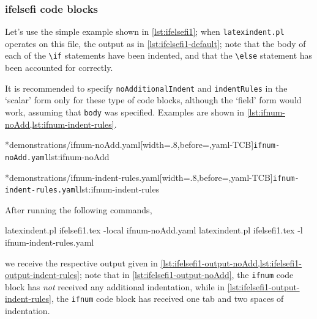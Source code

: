 \subsubsection{ifelsefi code blocks}
	Let's use the simple example shown in \cref{lst:ifelsefi1}; when
	\texttt{latexindent.pl} operates on this file, the output as in \cref{lst:ifelsefi1-default};
	note that the body of each of the \lstinline!\if! statements have been indented,
	and that the \lstinline!\else! statement has been accounted for correctly.

	\begin{minipage}{.45\textwidth}
	\end{minipage}%
	\hfill
	\begin{minipage}{.54\textwidth}
	\end{minipage}

	It is recommended to specify \texttt{noAdditionalIndent} and \texttt{indentRules} in the `scalar' form only
	for these type of code blocks, although the `field' form would work, assuming that \texttt{body} was specified.
	Examples are shown in \cref{lst:ifnum-noAdd,lst:ifnum-indent-rules}.

	\begin{minipage}{.45\textwidth}
		\cmhlistingsfromfile[style=yaml-LST]*{demonstrations/ifnum-noAdd.yaml}[width=.8\linewidth,before=\centering,yaml-TCB]{\texttt{ifnum-noAdd.yaml}}{lst:ifnum-noAdd}
	\end{minipage}
	\hfill
	\begin{minipage}{.45\textwidth}
		\cmhlistingsfromfile[style=yaml-LST]*{demonstrations/ifnum-indent-rules.yaml}[width=.8\linewidth,before=\centering,yaml-TCB]{\texttt{ifnum-indent-rules.yaml}}{lst:ifnum-indent-rules}
	\end{minipage}

	After running the following commands,
	\begin{commandshell}
latexindent.pl ifelsefi1.tex -local ifnum-noAdd.yaml  
latexindent.pl ifelsefi1.tex -l ifnum-indent-rules.yaml  
\end{commandshell}
	we receive the respective output given in \cref{lst:ifelsefi1-output-noAdd,lst:ifelsefi1-output-indent-rules}; note that
	in \cref{lst:ifelsefi1-output-noAdd}, the \texttt{ifnum} code block has \emph{not} received any additional indentation,
	while in \cref{lst:ifelsefi1-output-indent-rules}, the \texttt{ifnum} code block has received one tab and two spaces of indentation.

